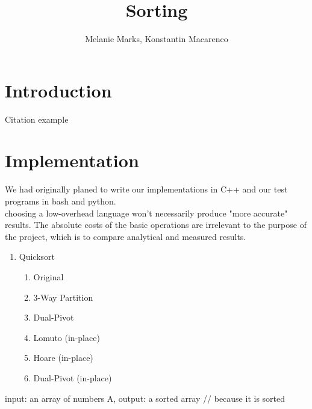 \documentclass{IEEEtran}
\title{Sorting}
\author{
    Melanie Marks, Konstantin Macarenco\\
}
\begin{document}
\maketitle
\thispagestyle{plain}
\pagestyle{plain}
\begin{abstract}

\end{abstract}
\tableofcontents
\section{Introduction}\label{sec:intro}
Citation example\cite{ABOOK}


\pagebreak
\section{Implementation}\label{sec:Implementation}
We had originally planed to write our implementations in C++ and our test programs in bash and python.  \\
choosing a low-overhead language won't necessarily produce "more accurate" results.  The absolute costs of the basic operations are irrelevant to the purpose of the project, which is to compare analytical and measured results.


\begin{enumerate}
\item Quicksort

\begin{enumerate}
\item Original
\item 3-Way Partition
\item Dual-Pivot
\item Lomuto (in-place)
\item Hoare (in-place)
\item Dual-Pivot (in-place)
\end{enumerate}

\end{enumerate}





\begin{algorithm}[h!]
    \begin{algorithmic}[1]
         {input:  an array of numbers A, output: a sorted array}
                \State{}  // because it is sorted
            \EndIf
            \State{}
        \EndFunction{}
    \end{algorithmic}
\end{algorithm}
\end{document}
